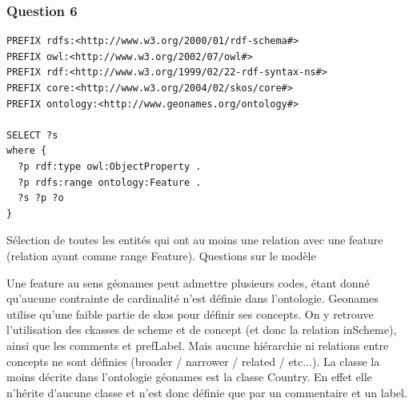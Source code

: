 \subsubsection{Question 6}
\begin{verbatim}
PREFIX rdfs:<http://www.w3.org/2000/01/rdf-schema#>
PREFIX owl:<http://www.w3.org/2002/07/owl#>
PREFIX rdf:<http://www.w3.org/1999/02/22-rdf-syntax-ns#>
PREFIX core:<http://www.w3.org/2004/02/skos/core#>
PREFIX ontology:<http://www.geonames.org/ontology#>

SELECT ?s
where {
  ?p rdf:type owl:ObjectProperty .
  ?p rdfs:range ontology:Feature .
  ?s ?p ?o
}
\end{verbatim}
Sélection de toutes les entités qui ont au moins une relation avec une feature (relation ayant comme range Feature).
Questions sur le modèle

    Une feature au sens géonames peut admettre plusieurs codes, étant donné qu'aucune contrainte de cardinalité n'est définie dans l'ontologie.
    Geonames utilise qu'une faible partie de skos pour définir ses concepts. On y retrouve l'utilisation des ckasses de scheme et de concept (et donc la relation inScheme), ainsi que les comments et prefLabel. Mais aucune hiérarchie ni relations entre concepts ne sont définies (broader / narrower / related / etc...).
    La classe la moins décrite dans l'ontologie géonames est la classe Country. En effet elle n'hérite d'aucune classe et n'est donc définie que par un commentaire et un label.
